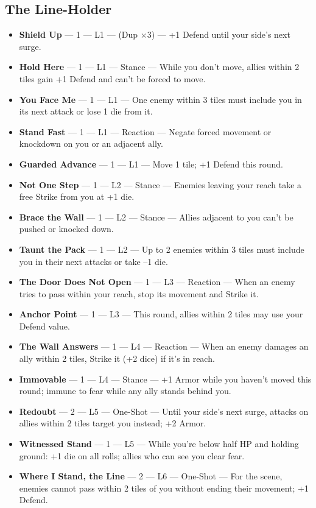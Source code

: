 \subsection{The Line-Holder}
\begin{itemize}
    \item \textbf{Shield Up} --- 1 --- L1 --- (Dup ×3) --- +1 Defend until your side's next surge.
    \item \textbf{Hold Here} --- 1 --- L1 --- Stance --- While you don't move, allies within 2 tiles gain +1 Defend and can't be forced to move.
    \item \textbf{You Face Me} --- 1 --- L1 --- One enemy within 3 tiles must include you in its next attack or lose 1 die from it.
    \item \textbf{Stand Fast} --- 1 --- L1 --- Reaction --- Negate forced movement or knockdown on you or an adjacent ally.
    \item \textbf{Guarded Advance} --- 1 --- L1 --- Move 1 tile; +1 Defend this round.
    \item \textbf{Not One Step} --- 1 --- L2 --- Stance --- Enemies leaving your reach take a free Strike from you at +1 die.
    \item \textbf{Brace the Wall} --- 1 --- L2 --- Stance --- Allies adjacent to you can't be pushed or knocked down.
    \item \textbf{Taunt the Pack} --- 1 --- L2 --- Up to 2 enemies within 3 tiles must include you in their next attacks or take --1 die.
    \item \textbf{The Door Does Not Open} --- 1 --- L3 --- Reaction --- When an enemy tries to pass within your reach, stop its movement and Strike it.
    \item \textbf{Anchor Point} --- 1 --- L3 --- This round, allies within 2 tiles may use your Defend value.
    \item \textbf{The Wall Answers} --- 1 --- L4 --- Reaction --- When an enemy damages an ally within 2 tiles, Strike it (+2 dice) if it's in reach.
    \item \textbf{Immovable} --- 1 --- L4 --- Stance --- +1 Armor while you haven't moved this round; immune to fear while any ally stands behind you.
    \item \textbf{Redoubt} --- 2 --- L5 --- One-Shot --- Until your side's next surge, attacks on allies within 2 tiles target you instead; +2 Armor.
    \item \textbf{Witnessed Stand} --- 1 --- L5 --- While you're below half HP and holding ground: +1 die on all rolls; allies who can see you clear fear.
    \item \textbf{Where I Stand, the Line} --- 2 --- L6 --- One-Shot --- For the scene, enemies cannot pass within 2 tiles of you without ending their movement; +1 Defend.
\end{itemize}

